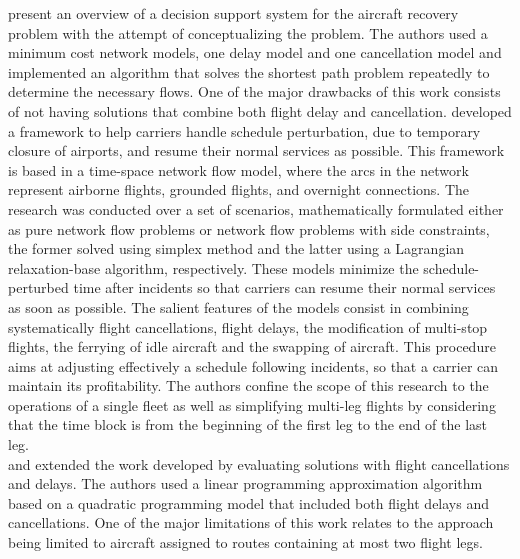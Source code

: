 \documentclass[ijoo,nonblindrev]{informs-ijoo}
\begin{document}
\citep{Jarrah1993} present an overview of a decision support system for the aircraft recovery problem with the attempt of conceptualizing the problem. The authors used a minimum cost network models, one delay model and one cancellation model and implemented an algorithm that solves the shortest path problem repeatedly to determine the necessary flows. One of the major drawbacks of this work consists of not having solutions that combine both flight delay and cancellation.
\citep{Yan1997} developed a framework to help carriers handle schedule perturbation, due to temporary closure of airports, and resume their normal services as possible. This framework is based in a time-space network flow model, where the arcs in the network represent airborne flights, grounded flights, and overnight connections. The research was conducted over a set of scenarios, mathematically formulated either as pure network flow problems or network flow problems with side constraints, the former solved using simplex method and the latter using a Lagrangian relaxation-base algorithm, respectively. These models minimize the schedule-perturbed time after incidents so that carriers can resume their normal services as soon as possible. The salient features of the models consist in combining systematically flight cancellations, flight delays, the modification of multi-stop flights, the ferrying of idle aircraft and the swapping of aircraft. This procedure aims at adjusting effectively a schedule following incidents, so that a carrier can maintain its profitability.  The authors confine the scope of this research to the operations of a single fleet as well as simplifying multi-leg flights by considering that the time block is from the beginning of the first leg to the end of the last leg.\\
\citep{Cao1997-I} and \citep{Cao1997-II} extended the work developed by \cite{Jarrah1993} evaluating solutions with flight cancellations and delays. The authors used a linear programming approximation algorithm based on   a quadratic programming model that included both flight delays and cancellations. One of the major limitations of this work relates to the approach being limited to aircraft assigned to routes containing at most two flight legs.\\
\end{document}
